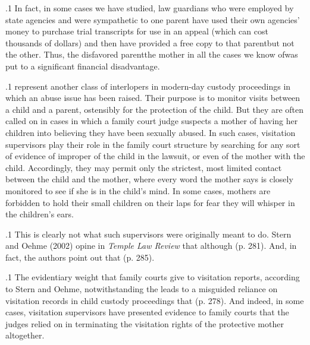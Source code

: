 \documentclass[11pt, twoside]{article}
\begin{document}
{\p.1{%
In fact, in some cases we have studied, law guardians who were employed by state agencies and were sympathetic to one parent have used
their own agencies’ money to purchase trial transcripts for use in an appeal (which can cost thousands of dollars) and then have provided a free
copy to that parent\mdash{}but not the other. Thus, the disfavored parent\mdash{}the
mother in all the cases we know of\mdash{}was put to a significant financial
disadvantage.
}%

\p.1{%
 represent another class of interlopers in
modern-day custody proceedings in which an abuse issue has been
raised. Their purpose is to monitor visits between a child and a parent,
ostensibly for the protection of the child. But they are often called on in
cases in which a family court judge suspects a mother of having
 her children into believing they have been sexually abused.
In such cases, visitation supervisors play their role in the family court
structure by searching for any sort of evidence of  improper
 of the child in the lawsuit, or even 
of the mother with the child. Accordingly, they may permit only the
strictest, most limited contact between the child and the mother, where
every word the mother says is closely monitored to see if she is  in the child’s mind. In some cases, mothers are forbidden to
hold their small children on their laps for fear they will whisper in the
children’s ears.
}%

\p.1{%
This is clearly not what such supervisors were originally meant to do.
Stern and Oehme (2002) opine in \textit{Temple Law Review} that although  (p. 281). And, in fact, the authors point out that
 (p. 285).
}%

\p.1{%
The evidentiary weight that family courts give to visitation reports,
according to Stern and Oehme, notwithstanding the  leads to a misguided reliance on visitation records in child custody proceedings that
 (p. 278). And indeed, in some cases, visitation
supervisors have presented evidence to family courts that the judges
relied on in terminating the visitation rights of the protective mother
altogether.
}%

}
\end{document}
